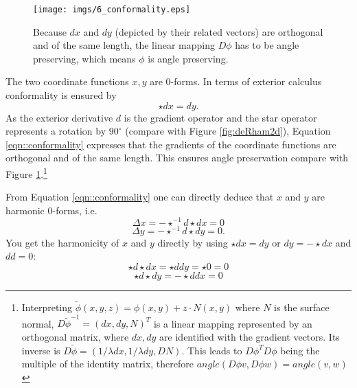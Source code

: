 \begin{figure}%
\begin{center}
\texttt{[image: imgs/6\_conformality.eps]}%
\end{center}
\caption{Because $dx$ and $dy$ (depicted by their related vectors) are orthogonal and of the same length, the linear mapping $D\phi$ has to be angle preserving, which means $\phi$ is angle preserving.}%
\label{fig:6_conformality}%
\end{figure}

The two coordinate functions $x,y$ are 0-forms. In terms of exterior calculus conformality is ensured by
\begin{equation}
 \star dx = dy.
 \label{eqn::conformality}
\end{equation}
As the exterior derivative $d$ is the gradient operator and the star operator represents a rotation by $90^\circ$ (compare with Figure \ref{fig:deRham2d}), Equation \ref{eqn::conformality} expresses that the gradients of the coordinate functions are orthogonal and of the same length. This ensures angle preservation compare with Figure \ref{fig:6_conformality}.\footnote{Interpreting $\tilde{\phi}(x,y,z) = \phi(x,y) + z\cdot N(x,y)$ where $N$ is the surface normal, $D\tilde{\phi}^{-1} = (dx ,dy,N)^T$ is a linear mapping represented by an orthogonal matrix, where $dx,dy$ are identified with the gradient vectors. Its inverse is $D\tilde{\phi} = (1/\lambda dx, 1/\lambda dy, DN)$.  This leads to $D\phi^T D\phi$ being the multiple of the identity matrix, therefore $angle (D\phi v , D\phi w )= angle(v,w)$}

From Equation \ref{eqn::conformality} one can directly deduce that $x$ and $y$ are harmonic 0-forms, i.e. 
\[\Delta x = - \star^{-1} d \star d x =0\]
\[\Delta y = - \star^{-1} d \star d y = 0.\] 
You get the harmonicity of $x$ and $y$ directly by using $\star d x = dy$ or $dy = -\star dx$  and $dd = 0$: 
\[\star d \star d x = \star ddy=  \star 0 = 0\]
\[\star d \star d y = -\star d d x = 0\]



